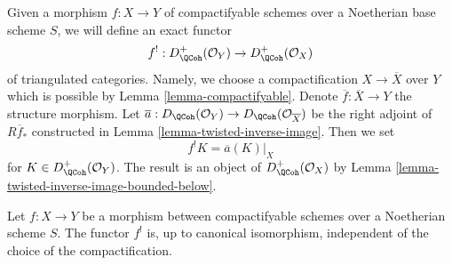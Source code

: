 \medskip\noindent
Given a morphism $f : X \to Y$ of compactifyable schemes over a Noetherian
base scheme $S$, we will define an exact functor
$$
f^! : D_\QCoh^+(\mathcal{O}_Y) \to D_\QCoh^+(\mathcal{O}_X)
$$
of triangulated categories. Namely, we choose a compactification
$X \to \overline{X}$ over $Y$ which is possible by
Lemma \ref{lemma-compactifyable}. Denote $\overline{f} : \overline{X} \to Y$
the structure morphism. Let
$\overline{a} : D_\QCoh(\mathcal{O}_Y) \to D_\QCoh(\mathcal{O}_{\overline{X}})$
be the right adjoint of $R\overline{f}_*$
constructed in Lemma \ref{lemma-twisted-inverse-image}. Then we set
$$
f^!K  = \overline{a}(K)|_X
$$
for $K \in D_\QCoh^+(\mathcal{O}_Y)$. The result is an object of
$D_\QCoh^+(\mathcal{O}_X)$ by
Lemma \ref{lemma-twisted-inverse-image-bounded-below}.

\begin{lemma}
\label{lemma-shriek-well-defined}
Let $f : X \to Y$ be a morphism between compactifyable schemes over a
Noetherian scheme $S$. The functor $f^!$ is, up to canonical isomorphism,
independent of the choice of the compactification.
\end{lemma}

